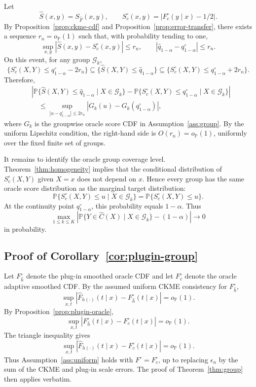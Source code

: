 \documentclass[11pt]{article}
\newcommand{\Gcal}{\mathcal G}
\newcommand{\Pp}{\mathbb P}
\newcommand{\abs}[1]{\left\lvert #1 \right\rvert}
\newcommand{\op}{o_{\mathbb P}}
\begin{document}
Let
\[
  \widehat S(x,y)=S_{\widehat F}(x,y),
  \qquad
  S_c^\circ(x,y)=\abs{F_c^\circ(y\mid x)-1/2}.
\]
By Proposition~\ref{prop:ckme-cdf} and Proposition~\ref{prop:error-transfer}, there exists a sequence \(r_n=\op(1)\) such that, with probability tending to one,
\[
  \sup_{x,y}\abs{\widehat S(x,y)-S_c^\circ(x,y)}\le r_n,
  \qquad
  \abs{\widehat q_{1-\alpha}-q^\circ_{1-\alpha}}\le r_n.
\]
On this event, for any group \(\Gcal_k\),
\[
  \{S_c^\circ(X,Y)\le q^\circ_{1-\alpha}-2r_n\}
  \subseteq
  \{\widehat S(X,Y)\le \widehat q_{1-\alpha}\}
  \subseteq
  \{S_c^\circ(X,Y)\le q^\circ_{1-\alpha}+2r_n\}.
\]
Therefore,
\[
\begin{aligned}
  &\abs{
  \Pp\{\widehat S(X,Y)\le\widehat q_{1-\alpha}\mid X\in\Gcal_k\}
  -
  \Pp\{S_c^\circ(X,Y)\le q^\circ_{1-\alpha}\mid X\in\Gcal_k\}
  }  \\
  &\quad\le
  \sup_{\abs{u-q^\circ_{1-\alpha}}\le 2r_n}
  \abs{G_k(u)-G_k(q^\circ_{1-\alpha})},
\end{aligned}
\]
where \(G_k\) is the groupwise oracle score CDF in Assumption~\ref{ass:group}. By the uniform Lipschitz condition, the right-hand side is \(O(r_n)=\op(1)\), uniformly over the fixed finite set of groups.

It remains to identify the oracle group coverage level. Theorem~\ref{thm:homogeneity} implies that the conditional distribution of \(S_c^\circ(X,Y)\) given \(X=x\) does not depend on \(x\). Hence every group has the same oracle score distribution as the marginal target distribution:
\[
  \Pp\{S_c^\circ(X,Y)\le u\mid X\in\Gcal_k\}
  =
  \Pp\{S_c^\circ(X,Y)\le u\}.
\]
At the continuity point \(q^\circ_{1-\alpha}\), this probability equals \(1-\alpha\). Thus
\[
  \max_{1\le k\le K}
  \abs{
  \Pp\{Y\in\widehat C(X)\mid X\in\Gcal_k\}
  -(1-\alpha)
  }
  \to 0
\]
in probability.

\subsection{Proof of Corollary~\ref{cor:plugin-group}}

Let \(F_{\widehat h}^{\circ}\) denote the plug-in smoothed oracle CDF and let \(F_c^\circ\) denote the oracle adaptive smoothed CDF. By the assumed uniform CKME consistency for \(F_{\widehat h}^{\circ}\),
\[
  \sup_{x,t}
  \abs{\widehat F_{h(\cdot)}(t\mid x)-F_{\widehat h}^{\circ}(t\mid x)}
  =
  \op(1).
\]
By Proposition~\ref{prop:plugin-oracle},
\[
  \sup_{x,t}
  \abs{F_{\widehat h}^{\circ}(t\mid x)-F_c^\circ(t\mid x)}
  =
  \op(1).
\]
The triangle inequality gives
\[
  \sup_{x,t}
  \abs{\widehat F_{h(\cdot)}(t\mid x)-F_c^\circ(t\mid x)}
  =
  \op(1).
\]
Thus Assumption~\ref{ass:uniform} holds with \(F^\circ=F_c^\circ\), up to replacing \(\epsilon_n\) by the sum of the CKME and plug-in scale errors. The proof of Theorem~\ref{thm:group} then applies verbatim.
\end{document}
